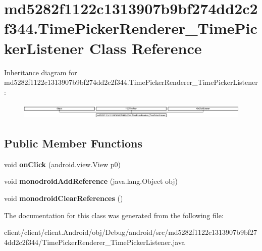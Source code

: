 \hypertarget{classmd5282f1122c1313907b9bf274dd2c2f344_1_1TimePickerRenderer__TimePickerListener}{}\section{md5282f1122c1313907b9bf274dd2c2f344.\+Time\+Picker\+Renderer\+\_\+\+Time\+Picker\+Listener Class Reference}
\label{classmd5282f1122c1313907b9bf274dd2c2f344_1_1TimePickerRenderer__TimePickerListener}
Inheritance diagram for md5282f1122c1313907b9bf274dd2c2f344.\+Time\+Picker\+Renderer\+\_\+\+Time\+Picker\+Listener\+:\begin{figure}[H]
\begin{center}
\leavevmode
\includegraphics[height=0.760353cm]{classmd5282f1122c1313907b9bf274dd2c2f344_1_1TimePickerRenderer__TimePickerListener}
\end{center}
\end{figure}
\subsection*{Public Member Functions}
\begin{DoxyCompactItemize}
\item 
\hypertarget{classmd5282f1122c1313907b9bf274dd2c2f344_1_1TimePickerRenderer__TimePickerListener_a6daaeb490eea7a19bbb2066a6d756e6f}{}void {\bfseries on\+Click} (android.\+view.\+View p0)\label{classmd5282f1122c1313907b9bf274dd2c2f344_1_1TimePickerRenderer__TimePickerListener_a6daaeb490eea7a19bbb2066a6d756e6f}

\item 
\hypertarget{classmd5282f1122c1313907b9bf274dd2c2f344_1_1TimePickerRenderer__TimePickerListener_a59fbc6b8c2101eab3033ec65d3fbff9c}{}void {\bfseries monodroid\+Add\+Reference} (java.\+lang.\+Object obj)\label{classmd5282f1122c1313907b9bf274dd2c2f344_1_1TimePickerRenderer__TimePickerListener_a59fbc6b8c2101eab3033ec65d3fbff9c}

\item 
\hypertarget{classmd5282f1122c1313907b9bf274dd2c2f344_1_1TimePickerRenderer__TimePickerListener_a7c69f45e1e2654cfa5735dc6590ac173}{}void {\bfseries monodroid\+Clear\+References} ()\label{classmd5282f1122c1313907b9bf274dd2c2f344_1_1TimePickerRenderer__TimePickerListener_a7c69f45e1e2654cfa5735dc6590ac173}

\end{DoxyCompactItemize}


The documentation for this class was generated from the following file\+:\begin{DoxyCompactItemize}
\item 
client/client/client.\+Android/obj/\+Debug/android/src/md5282f1122c1313907b9bf274dd2c2f344/Time\+Picker\+Renderer\+\_\+\+Time\+Picker\+Listener.\+java\end{DoxyCompactItemize}
